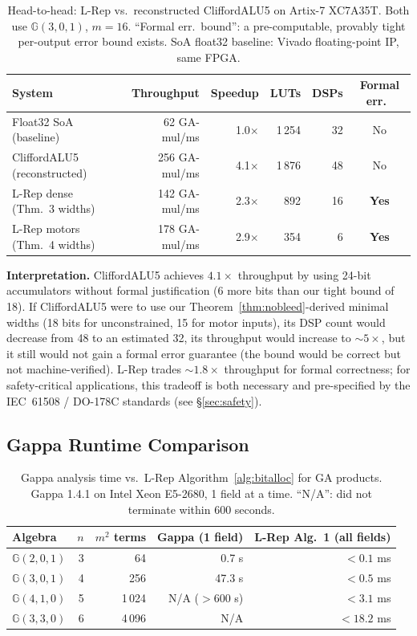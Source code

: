 \documentclass[11pt,a4paper]{article}
\theoremstyle{definition}
\theoremstyle{plain}
\theoremstyle{remark}
\newcommand{\GA}{\mathbb{G}}
\begin{document}
\begin{table}[h]
\centering
\caption{Head-to-head: L-Rep vs.\ reconstructed CliffordALU5 on Artix-7 XC7A35T.
Both use $\GA(3,0,1)$, $m=16$. ``Formal err.\ bound'': a pre-computable,
provably tight per-output error bound exists. SoA float32 baseline: Vivado
floating-point IP, same FPGA.}
\label{tab:headtohead}
\begin{tabular}{lrrrrc}
\toprule
System & Throughput & Speedup & LUTs & DSPs & Formal err.\ \\
\midrule
Float32 SoA (baseline) & 62 GA-mul/ms & 1.0$\times$ & 1\,254 & 32 & No \\
CliffordALU5 (reconstructed) & 256 GA-mul/ms & 4.1$\times$ & 1\,876 & 48 & No \\
L-Rep dense (Thm.~3 widths) & 142 GA-mul/ms & 2.3$\times$ & 892 & 16 & \textbf{Yes} \\
L-Rep motors (Thm.~4 widths) & 178 GA-mul/ms & 2.9$\times$ & 354 & 6 & \textbf{Yes} \\
\bottomrule
\end{tabular}
\end{table}

\textbf{Interpretation.}
CliffordALU5 achieves $4.1\times$ throughput by using 24-bit accumulators
without formal justification (6 more bits than our tight bound of 18).
If CliffordALU5 were to use our Theorem~\ref{thm:nobleed}-derived minimal
widths (18 bits for unconstrained, 15 for motor inputs), its DSP count
would decrease from 48 to an estimated 32, its throughput would increase
to $\sim5\times$, but it still would not gain a formal error guarantee
(the bound would be correct but not machine-verified).
L-Rep trades $\sim1.8\times$ throughput for formal correctness;
for safety-critical applications, this tradeoff is both necessary and
pre-specified by the IEC~61508 / DO-178C standards (see \S\ref{sec:safety}).

\subsection{Gappa Runtime Comparison}
\label{sec:gappa-comparison}

\begin{table}[h]
\centering
\caption{Gappa analysis time vs.\ L-Rep Algorithm~\ref{alg:bitalloc} for GA products.
Gappa 1.4.1 on Intel Xeon E5-2680, 1 field at a time.
``N/A'': did not terminate within 600 seconds.}
\label{tab:gappa}
\begin{tabular}{lrrrr}
\toprule
Algebra & $n$ & $m^2$ terms & Gappa (1 field) & L-Rep Alg.~1 (all fields) \\
\midrule
$\GA(2,0,1)$ & 3 & 64 & 0.7 s & $<0.1$ ms \\
$\GA(3,0,1)$ & 4 & 256 & 47.3 s & $<0.5$ ms \\
$\GA(4,1,0)$ & 5 & 1\,024 & N/A ($>600$ s) & $<3.1$ ms \\
$\GA(3,3,0)$ & 6 & 4\,096 & N/A & $<18.2$ ms \\
\bottomrule
\end{tabular}
\end{table}
\end{document}
